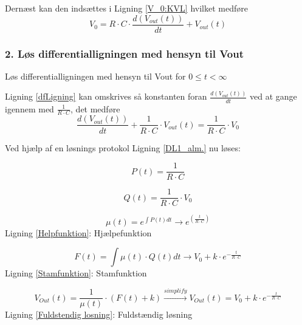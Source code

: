 Dernæst kan den indsættes i Ligning \ref{V_0:KVL} hvilket medføre 
\begin{equation}
 V_{0}= R \cdot C \cdot \frac{d(V_{out}(t))}{dt} + V_{out}(t)
\end{equation}
	
\subsubsection*{2. Løs differentialligningen med hensyn til Vout }
 Løs differentialligningen med hensyn til Vout for $ 0\leq t<\infty$
 
 Ligning \ref{dfLigning} kan omskrives så konstanten foran $\frac{d(V_{out}(t))}{dt}$ ved at gange igennem med $\frac{1}{R \cdot C}$, det medføre 
\begin{equation}
\frac{d(V_{out}(t))}{dt}+\frac{1}{R \cdot C}\cdot V_{out}(t) =\frac{1}{R \cdot C} \cdot V_{0}
\label{DL1_alm.}
\end{equation} 

Ved hjælp af en løsnings protokol Ligning \ref{DL1_alm.} nu løses:

\begin{equation}
P(t) = \frac{1}{R \cdot C}
\end{equation}

\begin{equation}
Q(t) = \frac{1}{R \cdot C}\cdot V_{0}
\end{equation}

\begin{center}
\begin{equation}
\mu(t) = e^{\int{P(t) dt}}\rightarrow e^{(\frac{t}{R \cdot C})}
\label{Helpfunktion}
\end{equation}
Ligning \ref{Helpfunktion}: Hjælpefunktion
\end{center}

\begin{center}
\begin{equation}
F(t)=\int{\mu(t) \cdot Q(t) dt}\rightarrow V_{0}+k \cdot e^{-\frac{t}{R \cdot C}}
\label{Stamfunktion}
\end{equation}
Ligning \ref{Stamfunktion}: Stamfunktion
\end{center}

\begin{center}
\begin{equation}
V_{Out}(t) = \frac{1}{\mu(t)} \cdot (F(t)+k) \xrightarrow[ ]{simplify} V_{Out}(t) = V_{0}+k \cdot e^{-\frac{t}{R \cdot C}}
\label{Fuldstendig losning}
\end{equation}
Ligning \ref{Fuldstendig losning}: Fuldstændig løsning
\end{center}

